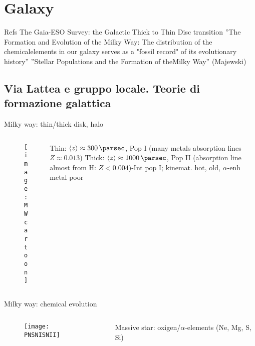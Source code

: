 \section{Galaxy}

\begin{frame}{Refs}
The Gaia-ESO Survey: the Galactic Thick to Thin Disc transition
''The Formation and Evolution of the Milky Way: The distribution of the chemicalelements in our galaxy serves as a "fossil record" of its evolutionary history''
''Stellar Populations and the Formation of theMilky Way'' (Majewski)
\end{frame}

\subsection{Via Lattea e gruppo locale. Teorie di formazione galattica}

\begin{frame}{Milky way: thin/thick disk, halo}
\begin{columns}[T]
\begin{column}{0.6\textwidth}
\begin{figure}[!ht]\texttt{[image: MWcartoon]}\label{fig:MWcartoon}\end{figure}
\end{column}
\begin{column}{0.4\textwidth}
Thin: $\exv{z}\approx\SI{300}{\parsec}$, Pop I (many metals absorption lines $Z\approx0.013$)
Thick: $\exv{z}\approx\SI{1000}{\parsec}$, Pop II (absorption line almost from H: $Z<0.004$)-Int pop I; kinemat. hot, old, $\alpha$-enh metal poor
\end{column}
\end{columns}
\end{frame}

\begin{frame}{Milky way: chemical evolution}
\begin{columns}[T]
\begin{column}{0.6\textwidth}
\begin{figure}[!ht]\texttt{[image: PNSNISNII]}\label{fig:PNSNISNII}
\end{figure}
\end{column}
\begin{column}{0.4\textwidth}
Massive star: oxigen/$\alpha$-elements (Ne, Mg, S, Si)
\end{column}
\end{columns}
\end{frame}

